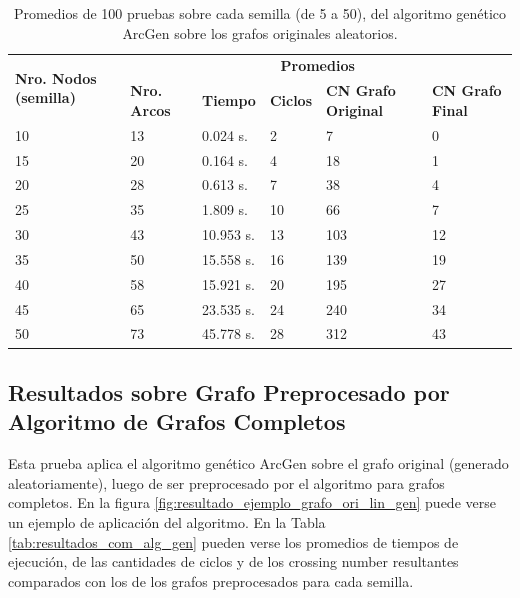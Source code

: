 \begin{table}[H]
	\caption{Promedios de 100 pruebas sobre cada semilla (de 5 a 50), del algoritmo genético ArcGen sobre los grafos originales aleatorios.}
	\label{tab:resultados_orig_alg_gen}
	\begin{tabularx}{\linewidth}{|p{1.5cm}|p{1.2cm}|p{1.5cm}|p{1.5cm}|X|X|}
		\hline
		\multirow{2}{2cm}{\textbf{Nro. Nodos (semilla)}} & \multicolumn{5}{c|}{\textbf{Promedios}} \\
		\cline{2-6}
		& \textbf{Nro. Arcos} & \textbf{Tiempo} & \textbf{Ciclos} & \textbf{CN Grafo Original} & \textbf{CN Grafo Final} \\
		\hline
		10 & 13 & 0.024 s. & 2 & 7 & 0 \\
		\hline
		15 & 20 & 0.164 s. & 4 & 18 & 1 \\
		\hline
		20 & 28 & 0.613 s. & 7 & 38 & 4 \\
		\hline
		25 & 35 & 1.809 s. & 10 & 66 & 7 \\
		\hline
		30 & 43 & 10.953 s. & 13 & 103 & 12 \\
		\hline
		35 & 50 & 15.558 s. & 16 & 139 & 19 \\
		\hline
		40 & 58 & 15.921 s. & 20 & 195 & 27 \\
		\hline
		45 & 65 & 23.535 s. & 24 & 240 & 34 \\
		\hline
		50 & 73 & 45.778 s. & 28 & 312 & 43 \\
		\hline
	\end{tabularx}
\end{table}

\subsection{Resultados sobre Grafo Preprocesado por Algoritmo de Grafos Completos}
Esta prueba aplica el algoritmo genético ArcGen sobre el grafo original (generado aleatoriamente), luego de ser preprocesado por el algoritmo para grafos completos. En la figura \ref{fig:resultado_ejemplo_grafo_ori_lin_gen} puede verse un ejemplo de aplicación del algoritmo. En la Tabla \ref{tab:resultados_com_alg_gen} pueden verse los promedios de tiempos de ejecución, de las cantidades de ciclos y de los crossing number resultantes comparados con los de los grafos preprocesados para cada semilla.

